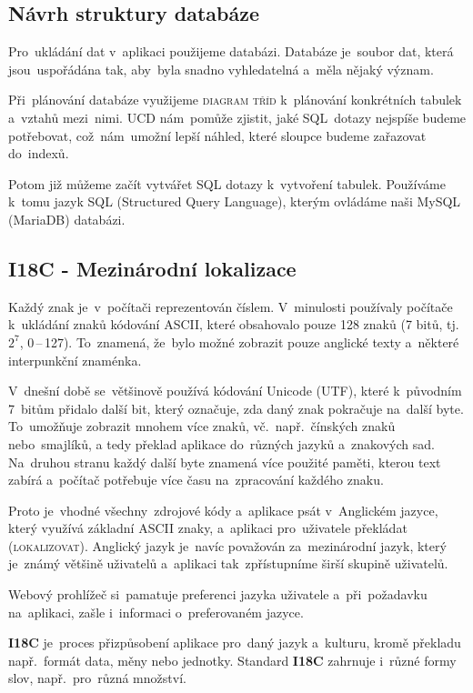 \documentclass[14pt,a4paper]{article}
\begin{document}
        \subsection{Návrh struktury databáze}
        Pro~ukládání dat v~aplikaci použijeme databázi. Databáze je~soubor dat, která jsou~uspořádána tak, aby~byla snadno vyhledatelná a~měla nějaký význam.

        Při~plánování databáze využijeme \textsc{diagram tříd} k~plánování konkrétních tabulek a~vztahů mezi~nimi. \textsc{UCD} nám~pomůže zjistit, jaké SQL~dotazy nejspíše budeme potřebovat, což~nám~umožní lepší náhled, které sloupce budeme zařazovat do~indexů.

        Potom již můžeme začít vytvářet SQL dotazy k~vytvoření tabulek. Používáme k~tomu jazyk \textsc{SQL} (Structured Query Language), kterým ovládáme naši MySQL (MariaDB) databázi.

        \subsection{I18C - Mezinárodní lokalizace}
        Každý znak je~v~počítači reprezentován číslem. V~minulosti používaly počítače k~ukládání znaků kódování \textsc{ASCII}, které obsahovalo pouze 128 znaků (7 bitů, tj.~$2^7$, 0\,--\,127). To~znamená, že~bylo možné zobrazit pouze anglické texty a~některé interpunkční znaménka. 
        
        V~dnešní době se~většinově používá kódování Unicode (UTF), které k~původním 7~bitům přidalo další bit, který označuje, zda daný znak pokračuje na~další byte. To~umožňuje zobrazit mnohem více znaků, vč.~např.~čínských znaků nebo~smajlíků, a tedy překlad aplikace do~různých jazyků a~znakových sad. Na~druhou stranu každý další byte znamená více použité paměti, kterou text zabírá a~počítač potřebuje více času na~zpracování každého znaku.
        
        Proto je~vhodné všechny~zdrojové kódy a~aplikace psát v~Anglickém jazyce, který využívá základní \textsc{ASCII} znaky, a~aplikaci pro~uživatele překládat (\textsc{lokalizovat}). Anglický jazyk je~navíc považován za~mezinárodní jazyk, který je~známý většině uživatelů a~aplikaci tak~zpřístupníme širší skupině uživatelů.
        
        Webový prohlížeč si~pamatuje preferenci jazyka uživatele a~při~požadavku na~aplikaci, zašle i~informaci o~preferovaném jazyce.

        \textbf{I18C} je~proces přizpůsobení aplikace pro~daný jazyk a~kulturu, kromě překladu např.~formát data, měny nebo jednotky. Standard \textbf{I18C} zahrnuje i~různé formy slov, např.~pro~různá množství. \parencite{w3Internationalization}
\end{document}
